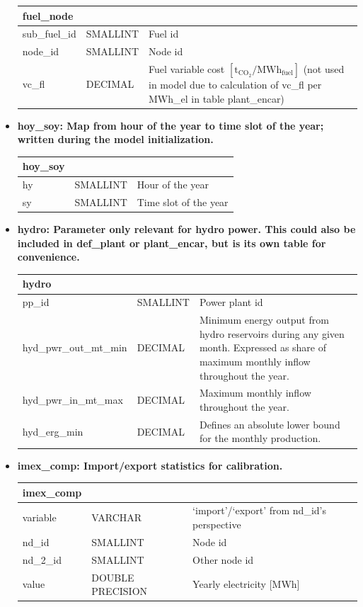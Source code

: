 \documentclass[]{article}
\begin{document}
\begin{itemize}
\begin{tabular}{@{}llp{10cm}@{}}
\toprule
fuel\_node & & \\
\midrule
sub\_fuel\_id & SMALLINT & Fuel id \\
node\_id & SMALLINT & Node id \\
vc\_fl & DECIMAL & Fuel variable cost $[\mathrm{t_{CO_2}/MWh_{fuel}}]$ (not used in model due to calculation of vc\_fl per MWh\_el in table plant\_encar) \\
\bottomrule
\end{tabular}

\item \textbf{hoy\_soy: Map from hour of the year to time slot of the year;
written during the model initialization.}

\begin{tabular}{@{}lll@{}}
\toprule
hoy\_soy & & \\
\midrule
hy & SMALLINT & Hour of the year \\
sy & SMALLINT & Time slot of the year \\
\bottomrule
\end{tabular}

\item \textbf{hydro: Parameter only relevant for hydro power. This could also
be included in def\_plant or plant\_encar, but is its own table for
convenience.}

\begin{tabular}{@{}llp{10cm}@{}}
\toprule
hydro & &
\\
\midrule
pp\_id & SMALLINT & Power plant id
\\
hyd\_pwr\_out\_mt\_min & DECIMAL & Minimum energy output from hydro
reservoirs during any given month. Expressed as share of maximum monthly
inflow throughout the year.
\\
hyd\_pwr\_in\_mt\_max & DECIMAL & Maximum monthly inflow throughout the
year.
\\
hyd\_erg\_min & DECIMAL & Defines an absolute lower bound for the
monthly production.
\\
\bottomrule
\end{tabular}

\item \textbf{imex\_comp: Import/export statistics for calibration.}

\begin{tabular}{@{}lll@{}}
\toprule
imex\_comp & &
\\
\midrule
variable & VARCHAR & `import'/`export' from nd\_id's perspective
\\
nd\_id & SMALLINT & Node id
\\
nd\_2\_id & SMALLINT & Other node id
\\
value & DOUBLE PRECISION & Yearly electricity {[}MWh{]}
\\
\bottomrule
\end{tabular}


\end{itemize}
\end{document}

